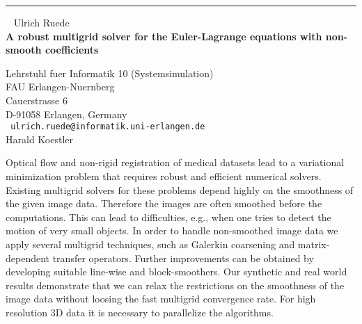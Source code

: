 \documentclass{report}
\begin{document}
\begin{center}

\rule{6in}{1pt} \
{\large
Ulrich Ruede
\\ {\bf
A robust multigrid solver for the Euler-Lagrange equations with
non-smooth coefficients
}}

Lehrstuhl fuer Informatik 10 (Systemsimulation) \\
FAU Erlangen-Nuernberg \\
Cauerstrasse 6 \\
D-91058 Erlangen, Germany
\\ {\tt
ulrich.ruede@informatik.uni-erlangen.de
}
\\
Harald Koestler
\end{center}


Optical flow and non-rigid registration of medical datasets lead to a
variational minimization problem that requires robust and efficient
numerical solvers. Existing multigrid solvers for these problems depend
highly on the smoothness of the given image data. Therefore the images
are often smoothed before the computations. This can lead to
difficulties, e.g., when one tries to detect the motion of very small
objects. In order to handle non-smoothed image data we apply several
multigrid techniques, such as Galerkin coarsening and matrix-dependent
transfer operators. Further improvements can be obtained by developing
suitable line-wise and block-smoothers. Our synthetic and real world
results demonstrate that we can relax the restrictions on the
smoothness of the image data without loosing the fast multigrid
convergence rate. For high resolution 3D data it is necessary to
parallelize the algorithms.
\end{document}
